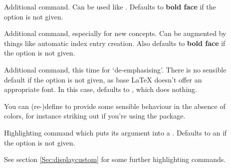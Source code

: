 \documentclass[12pt]{scrartcl}
\let\newslide=\relax
\begin{document}
  \begin{description}
  \item[]
    Additional  command. Can be used like . Defaults
    to \textbf{bold face} if the  option is not given.

  \item[]
    Additional  command, especially for new concepts. Can be
    augmented by things like automatic index entry creation. Also defaults to \textbf{bold face} if the
     option is not given.

  \item[]
    Additional  command, this time for `de-emphasising'. There is
    no sensible default if the  option is not given, as base \LaTeX{} doesn't offer an appropriate
    font. In this case,  defaults to , which does nothing.

    You can (re-)define  to provide some sensible behaviour in the absence of colors, for
    instance striking out if you're using the
    \href{ftp://ftp.dante.de/tex-archive/help/Catalogue/entries/soul.html}{} package.
  \end{description}


  \begin{description}
  \item[]
    Highlighting command which puts its argument into a . Defaults to an  if the  option is not given.

    See section \ref{Sec:displaycustom} for some further highlighting commands.
  \end{description}

  \newslide
\end{document}
